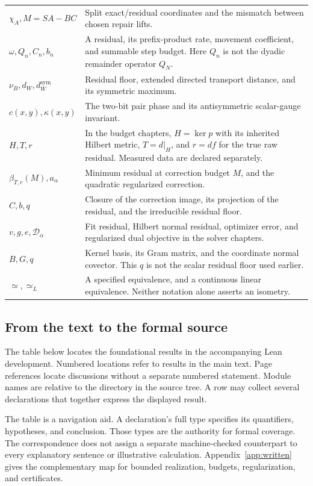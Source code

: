 \begin{longtable}{@{}p{.25\linewidth}p{.7\linewidth}@{}}
\(\chi_A,M=SA-BC\) & Split exact/residual coordinates and the mismatch between chosen repair lifts.\\
\(\omega,Q_n,C_n,b_n\) & A residual, its prefix-product rate, movement coefficient, and summable step budget. Here $Q_n$ is not the dyadic remainder operator $Q_N$.\\
\(\nu_B,d_W,d_W^{\mathrm{sym}}\) & Residual floor, extended directed transport distance, and its symmetric maximum.\\
\(c(x,y),\kappa(x,y)\) & The two-bit pair phase and its antisymmetric scalar-gauge invariant.\\
\(H,T,r\) & In the budget chapters, $H=\ker p$ with its inherited Hilbert metric, $T=d|_H$, and $r=df$ for the true raw residual. Measured data are declared separately.\\
\(\beta_{T,r}(M),a_\alpha\) & Minimum residual at correction budget $M$, and the quadratic regularized correction.\\
\(C,b,q\) & Closure of the correction image, its projection of the residual, and the irreducible residual floor.\\
\(v,g,e,\mathcal D_\alpha\) & Fit residual, Hilbert normal residual, optimizer error, and regularized dual objective in the solver chapters.\\
\(B,G,q\) & Kernel basis, its Gram matrix, and the coordinate normal covector. This $q$ is not the scalar residual floor used earlier.\\
\(\simeq,\simeq_L\) & A specified equivalence, and a continuous linear equivalence. Neither notation alone asserts an isometry.\\
\bottomrule
\end{longtable}

\subsection{From the text to the formal source}
The table below locates the foundational results in the accompanying Lean development. Numbered locations refer to results in the main text. Page references locate discussions without a separate numbered statement. Module names are relative to the  directory in the  source tree. A row may collect several declarations that together express the displayed result.

The table is a navigation aid. A declaration's full type specifies its quantifiers, hypotheses, and conclusion. Those types are the authority for formal coverage. The correspondence does not assign a separate machine-checked counterpart to every explanatory sentence or illustrative calculation. Appendix~\ref{app:written} gives the complementary map for bounded realization, budgets, regularization, and certificates.

